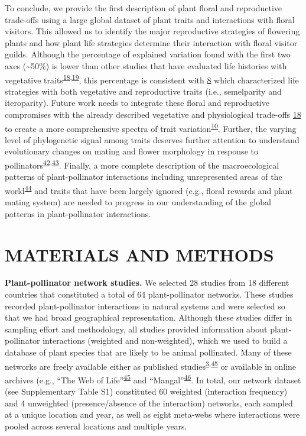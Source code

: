 \documentclass[12pt,a4paper,]{article}
\begin{document}
To conclude, we provide the first description of plant floral and
reproductive trade-offs using a large global dataset of plant traits and
interactions with floral visitors. This allowed us to identify the major
reproductive strategies of flowering plants and how plant life
strategies determine their interaction with floral visitor guilds.
Although the percentage of explained variation found with the first two
axes (\textasciitilde{}50\%) is lower than other studies that have
evaluated life histories with vegetative
traits\textsuperscript{\protect\hyperlink{ref-diaz2016}{18},\protect\hyperlink{ref-carmona2021}{19}},
this percentage is consistent with
\protect\hyperlink{ref-salguero2016}{8} which characterized life
strategies with both vegetative and reproductive traits (i.e.,
semelparity and iteroparity). Future work needs to integrate these
floral and reproductive compromises with the already described
vegetative and physiological trade-offs
\protect\hyperlink{ref-diaz2016}{18} to create a more comprehensive
spectra of trait
variation\textsuperscript{\protect\hyperlink{ref-roddy2021}{10}}.
Further, the varying level of phylogenetic signal among traits deserves
further attention to understand evolutionary changes on mating and
flower morphology in response to
pollinators\textsuperscript{\protect\hyperlink{ref-gervasi2017}{42},\protect\hyperlink{ref-mackin2021}{43}}.
Finally, a more complete description of the macroecological patterns of
plant-pollinator interactions including unrepresented areas of the
world\textsuperscript{\protect\hyperlink{ref-poisot2021}{44}} and traits
that have been largely ignored (e.g., floral rewards and plant mating
system) are needed to progress in our understanding of the global
patterns in plant-pollinator interactions.

\section{MATERIALS AND METHODS}\label{materials-and-methods}

\textbf{Plant-pollinator network studies.} We selected 28 studies from
18 different countries that constituted a total of 64 plant-pollinator
networks. These studies recorded plant-pollinator interactions in
natural systems and were selected so that we had broad geographical
representation. Although these studies differ in sampling effort and
methodology, all studies provided information about plant-pollinator
interactions (weighted and non-weighted), which we used to build a
database of plant species that are likely to be animal pollinated. Many
of these networks are freely available either as published
studies\textsuperscript{\protect\hyperlink{ref-carvalheiro2014}{3},\protect\hyperlink{ref-fortuna2010}{45}}
or available in online archives (e.g., ``The Web of
Life''\textsuperscript{\protect\hyperlink{ref-fortuna2010}{45}} and
``Mangal''\textsuperscript{\protect\hyperlink{ref-poisot2016}{46}}. In
total, our network dataset (see Supplementary Table S1) constituted 60
weighted (interaction frequency) and 4 unweighted (presence/absence of
the interaction) networks, each sampled at a unique location and year,
as well as eight meta-webs where interactions were pooled across several
locations and multiple years.
\end{document}
